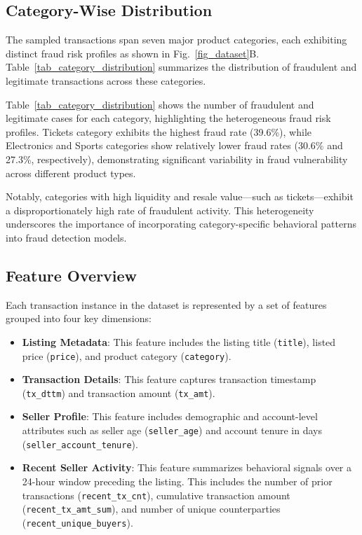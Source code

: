 \documentclass[sigconf]{acmart}
\begin{document}
\subsection{Category-Wise Distribution}
The sampled transactions span seven major product categories, each exhibiting distinct fraud risk profiles as shown in Fig.~\ref{fig_dataset}B. Table~\ref{tab_category_distribution} summarizes the distribution of fraudulent and legitimate transactions across these categories.

Table~\ref{tab_category_distribution} shows the number of fraudulent and legitimate cases for each category, highlighting the heterogeneous fraud risk profiles. Tickets category exhibits the highest fraud rate (39.6\%), while Electronics and Sports categories show relatively lower fraud rates (30.6\% and 27.3\%, respectively), demonstrating significant variability in fraud vulnerability across different product types.

Notably, categories with high liquidity and resale value—such as tickets—exhibit a disproportionately high rate of fraudulent activity. This heterogeneity underscores the importance of incorporating category-specific behavioral patterns into fraud detection models.


\subsection{Feature Overview}\label{feature_overview}
Each transaction instance in the dataset is represented by a set of features grouped into four key dimensions:

\begin{itemize}
    \item \textbf{Listing Metadata}: This feature includes the listing title (\texttt{title}), listed price (\texttt{price}), and product category (\texttt{category}).
    \item \textbf{Transaction Details}: This feature captures transaction timestamp (\texttt{tx\_dttm}) and transaction amount (\texttt{tx\_amt}).
    \item \textbf{Seller Profile}: This feature includes demographic and account-level attributes such as seller age (\texttt{seller\_age}) and account tenure in days (\texttt{seller\_account\_tenure}).
    \item \textbf{Recent Seller Activity}: This feature summarizes behavioral signals over a 24-hour window preceding the listing. This includes the number of prior transactions (\texttt{recent\_tx\_cnt}), cumulative transaction amount (\texttt{recent\_tx\_amt\_sum}), and number of unique counterparties (\texttt{recent\_unique\_buyers}).
\end{itemize}
\end{document}
